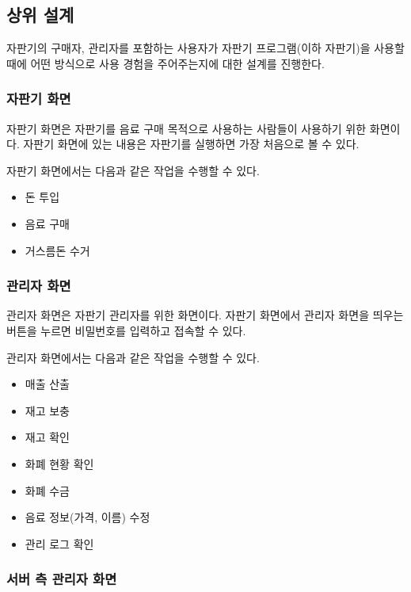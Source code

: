 \documentclass{oblivoir}
\begin{document}
    \subsection{상위 설계}

    자판기의 구매자, 관리자를 포함하는 사용자가
    자판기 프로그램(이하 자판기)을 사용할 때에
    어떤 방식으로 사용 경험을 주어주는지에 대한 설계를 진행한다.

    \subsubsection{자판기 화면}

    자판기 화면은 자판기를 음료 구매 목적으로 사용하는 사람들이
    사용하기 위한 화면이다.
    자판기 화면에 있는 내용은 자판기를 실행하면 가장 처음으로 볼 수 있다.

    자판기 화면에서는 다음과 같은 작업을 수행할 수 있다.

    \begin{itemize}
        \item 돈 투입
        \item 음료 구매
        \item 거스름돈 수거
    \end{itemize}

    \subsubsection{관리자 화면}

    관리자 화면은 자판기 관리자를 위한 화면이다.
    자판기 화면에서 관리자 화면을 띄우는 버튼을 누르면
    비밀번호를 입력하고 접속할 수 있다.

    관리자 화면에서는 다음과 같은 작업을 수행할 수 있다.

    \begin{itemize}
        \item 매출 산출
        \item 재고 보충
        \item 재고 확인
        \item 화폐 현황 확인
        \item 화폐 수금
        \item 음료 정보(가격, 이름) 수정
        \item 관리 로그 확인
    \end{itemize}

    \subsubsection{서버 측 관리자 화면}
\end{document}
